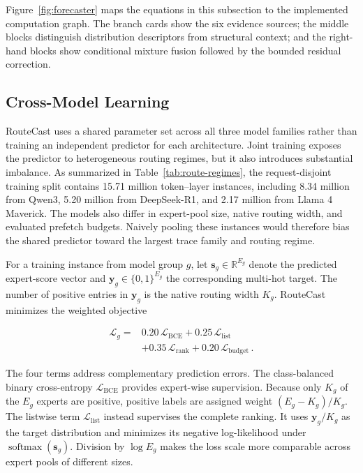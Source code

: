 \documentclass[conference]{IEEEtran}
\begin{document}
Figure~\ref{fig:forecaster} maps the equations in this subsection to the
implemented computation graph. The branch cards show the six evidence sources;
the middle blocks distinguish distribution descriptors from structural
context; and the right-hand blocks show conditional mixture fusion followed by
the bounded residual correction.

\subsection{Cross-Model Learning}
\label{sec:cross-model-learning}

RouteCast uses a shared parameter set across all three model families rather
than training an independent predictor for each architecture. Joint training
exposes the predictor to heterogeneous routing regimes, but it also introduces
substantial imbalance. As summarized in Table~\ref{tab:route-regimes}, the
request-disjoint training split contains
15.71 million token--layer instances, including 8.34 million from Qwen3,
5.20 million from DeepSeek-R1, and 2.17 million from Llama 4 Maverick.
The models also differ in expert-pool size, native routing width, and evaluated
prefetch budgets. Naively pooling these instances would therefore bias the
shared predictor toward the largest trace family and routing regime.

For a training instance from model group \(g\), let
\(\mathbf{s}_{g}\in\mathbb{R}^{E_g}\) denote the predicted expert-score vector
and \(\mathbf{y}_{g}\in\{0,1\}^{E_g}\) the corresponding multi-hot target.
The number of positive entries in \(\mathbf{y}_g\) is the native routing width
\(K_g\). RouteCast minimizes the weighted objective

\begin{equation}
\begin{split}
\mathcal{L}_{g} ={}&
0.20\,\mathcal{L}_{\mathrm{BCE}}
+0.25\,\mathcal{L}_{\mathrm{list}} \\
&+0.35\,\mathcal{L}_{\mathrm{rank}}
+0.20\,\mathcal{L}_{\mathrm{budget}}\,.
\end{split}
\label{eq:total-loss}
\end{equation}

The four terms address complementary prediction errors.
The class-balanced binary cross-entropy
\(\mathcal{L}_{\mathrm{BCE}}\) provides expert-wise supervision. Because only
\(K_g\) of the \(E_g\) experts are positive, positive labels are assigned
weight \((E_g-K_g)/K_g\). The listwise term
\(\mathcal{L}_{\mathrm{list}}\) instead supervises the complete ranking. It
uses \(\mathbf{y}_g/K_g\) as the target distribution and minimizes its
negative log-likelihood under
\(\operatorname{softmax}(\mathbf{s}_g)\). Division by \(\log E_g\) makes the
loss scale more comparable across expert pools of different sizes.
\end{document}
